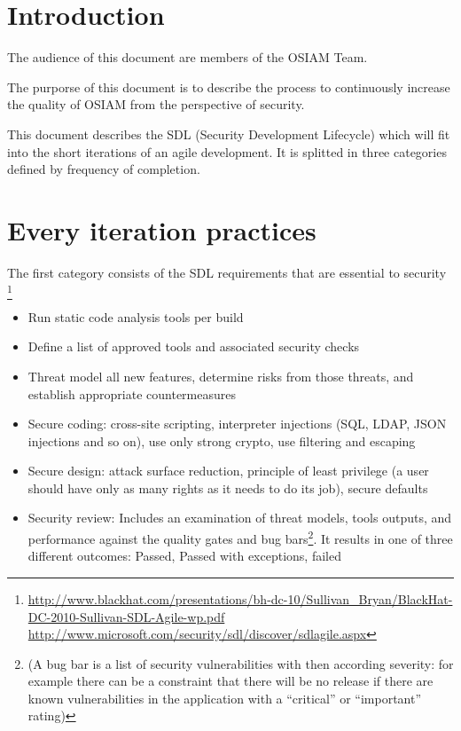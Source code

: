 \section{Introduction}

The audience of this document are members of the OSIAM Team.

The purporse of this document is to describe the process to continuously increase the quality of
OSIAM from the perspective of security.

This document describes the SDL (Security Development Lifecycle) which will fit into the short iterations of an agile development. It is splitted in three categories defined by frequency of completion.

\section{Every iteration practices}

The first category consists of the SDL requirements that are essential to security \footnote{\url{http://www.blackhat.com/presentations/bh-dc-10/Sullivan_Bryan/BlackHat-DC-2010-Sullivan-SDL-Agile-wp.pdf} \url{http://www.microsoft.com/security/sdl/discover/sdlagile.aspx}}

\begin{itemize}
	\item Run static code analysis tools per build
	\item Define a list of approved tools and associated security checks
	\item Threat model all new features, determine risks from those threats, and establish appropriate countermeasures 
	\item Secure coding: cross-site scripting, interpreter injections (SQL, LDAP, JSON injections and so on), use only strong crypto, use filtering and escaping
	\item Secure design: attack surface reduction, principle of least privilege (a user should have only as many rights as it needs to do its job), secure defaults	
	\item Security review: Includes an examination of threat models, tools outputs, and performance against the quality gates and bug bars\footnote{(A bug bar is a list of security vulnerabilities with then according severity: for example there can be a constraint that there will be no release if there are known vulnerabilities in the application with a ``critical'' or ``important'' rating)}. It results in one of three different outcomes: Passed, Passed with exceptions, failed  
\end{itemize}

